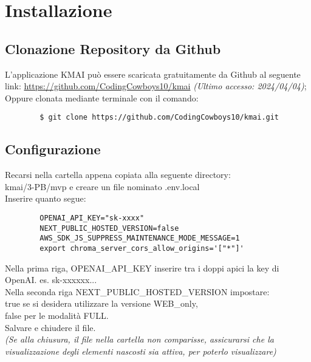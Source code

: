 \chapter{Installazione} \label{cap:Inst}
\section{Clonazione Repository da Github}
L'applicazione KMAI può essere scaricata gratuitamente da Github al seguente link: \url{https://github.com/CodingCowboys10/kmai} \textit{(Ultimo accesso: 2024/04/04)}; \\
Oppure clonata mediante terminale con il comando:
    \begin{lstlisting}
        $ git clone https://github.com/CodingCowboys10/kmai.git
    \end{lstlisting}

\section{Configurazione}
Recarsi nella cartella appena copiata alla seguente directory: \\
kmai/3-PB/mvp e creare un file nominato .env.local\\
Inserire quanto segue:
    \begin{lstlisting}
        OPENAI_API_KEY="sk-xxxx"
        NEXT_PUBLIC_HOSTED_VERSION=false
        AWS_SDK_JS_SUPPRESS_MAINTENANCE_MODE_MESSAGE=1
        export chroma_server_cors_allow_origins='["*"]'
    \end{lstlisting}
Nella prima riga, OPENAI\_API\_KEY inserire tra i doppi apici la key di OpenAI. es. sk-xxxxxx...\\
Nella seconda riga NEXT\_PUBLIC\_HOSTED\_VERSION impostare:\\ true se si desidera utilizzare la versione WEB\_only,\\ false per le modalità FULL.\\
Salvare e chiudere il file.\\
\textit{(Se alla chiusura, il file nella cartella non comparisse, assicurarsi che la visualizzazione degli elementi nascosti sia attiva, per poterlo visualizzare)}

